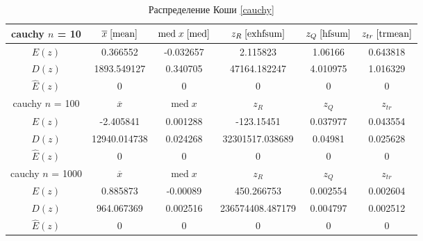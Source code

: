 \documentclass[a4paper,12pt]{article} %
\begin{document}
\begin{table}[H]
    \centering
    \begin{tabular}{|c|c|c|c|c|c|}
        \hline
         cauchy $n$ = 10&$\overline{x}\;\eqref{mean}$&$\mathrm{med}\;x\;\eqref{med}$&$z_R\;\eqref{exhfsum}$&$z_Q\;\eqref{hfsum}$&$z_{tr}\;\eqref{trmean}$\\
        \hline
        $E(z)$&0.366552&-0.032657&2.115823&1.06166&0.643818\\
        \hline
        $D(z)$&1893.549127&0.340705&47164.182247&4.010975&1.016329\\
        \hline
        $\hat{E}(z)$&0&0&0&0&0\\
        \hline
        cauchy $n$ = 100&$\overline{x}$&$\mathrm{med}\;x$&$z_R$&$z_Q$&$z_{tr}$\\
        \hline
        $E(z)$&-2.405841&0.001288&-123.15451&0.037977&0.043554\\
        \hline
        $D(z)$&12940.014738&0.024268&32301517.038689&0.04981&0.025628\\
        \hline
        $\hat{E}(z)$&0&0&0&0&0\\
        \hline
        cauchy $n$ = 1000 &$\overline{x}$&$\mathrm{med}\;x$&$z_R$&$z_Q$&$z_{tr}$\\
        \hline
        $E(z)$&0.885873&-0.00089&450.266753&0.002554&0.002604\\
        \hline
        $D(z)$&964.067369&0.002516&236574408.487179&0.004797&0.002512\\
        \hline
        $\hat{E}(z)$&0&0&0&0&0\\
        \hline
    \end{tabular}
    \caption{Распределение Коши \eqref{cauchy}}
    \label{tab:cauchy}
\end{table}
\end{document}
